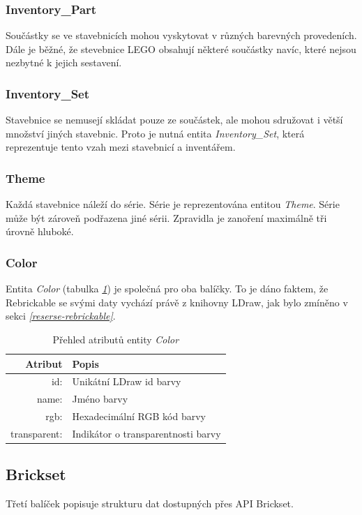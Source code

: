\subsubsection*{Inventory\_Part} 
Součástky se ve stavebnicích mohou vyskytovat v různých barevných provedeních. Dále je běžné, že stevebnice LEGO obsahují některé součástky navíc, které nejsou nezbytné k jejich sestavení.

\subsubsection*{Inventory\_Set}
Stavebnice se nemusejí skládat pouze ze součástek, ale mohou sdružovat i větší množství jiných stavebnic. Proto je nutná entita \textit{Inventory\_Set}, která reprezentuje tento vzah mezi stavebnicí a inventářem.

\subsubsection*{Theme}
Každá stavebnice náleží do série. Série je reprezentována entitou \textit{Theme}. Série může být zároveň podřazena jiné sérii. Zpravidla je zanoření maximálně tři úrovně hluboké.

\subsubsection*{Color} 
Entita \textit{Color} (tabulka \emph{\ref{table:entity:color}}) je společná pro oba balíčky. To je dáno faktem, že Rebrickable se svými daty vychází právě z knihovny LDraw, jak bylo zmíněno v sekci \emph{\ref{reserse-rebrickable}}.

\begin{table}[th!]
  \centering
  \caption{Přehled atributů entity \textit{Color}}
  \label{table:entity:color}
  \begin{tabularx}{\textwidth}{@{}rX@{}}
  \toprule
  Atribut & Popis
  \\ \midrule
  id: & Unikátní LDraw id barvy \autocite{ldraw:colors}
  \\
  name: & Jméno barvy
  \\
  rgb: & Hexadecimální \gls{RGB} kód barvy 
  \\
  transparent: & Indikátor o transparentnosti barvy
  \\
  \bottomrule
  \end{tabularx}
\end{table}

\subsection{Brickset}
Třetí balíček popisuje strukturu dat dostupných přes \gls{API} Brickset.   

